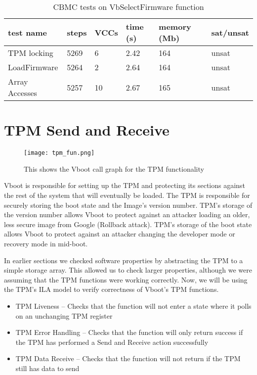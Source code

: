 \begin{table}[!htbp]
    \centering
    \caption{CBMC tests on VbSelectFirmware function}\label{sfw_results}
    \begin{tabular}{llllll}
        \toprule
        test name & steps & VCCs & time (s) & memory (Mb) & sat/unsat  \\ \bottomrule
        TPM locking & 5269 & 6 & 2.42 & 164 & unsat \\
        LoadFirmware & 5264 & 2 & 2.64 & 164 & unsat \\
        Array Accesses & 5257 & 10 & 2.67 & 165 &  unsat \\\bottomrule
    \end{tabular}
\end{table}

\section{TPM Send and Receive}

\begin{figure}[!htbp]
  \centering
  \texttt{[image: tpm\_fun.png]}
  \caption[TPM Call Graph]{This shows the Vboot call graph for the TPM functionality}\label{fig:tpm_call_graph}
\end{figure}

Vboot is responsible for setting up the TPM and protecting its
sections against the rest of the system that will eventually be loaded.
The TPM is responsible for securely storing the boot state and the
Image's version number.
TPM's storage of the version number allows Vboot to protect against 
an attacker loading an older, less secure image from Google (Rollback attack).
TPM's storage of the boot state allows Vboot to protect against an attacker 
changing the developer mode or recovery mode in mid-boot.

In earlier sections we checked software properties by abstracting the TPM to a simple storage array. 
This allowed us to check larger properties, although we were assuming that the TPM functions were working correctly.
Now, we will be using the TPM's ILA model to verify correctness of Vboot's TPM functions.

\begin{itemize}
   \item TPM Liveness -- Checks that the function will not enter a state where it polls on an unchanging TPM register
   \item TPM Error Handling -- Checks that the function will only return success if the TPM has performed a Send and Receive action successfully
   \item TPM Data Receive -- Checks that the function will not return if the TPM still has data to send 
\end{itemize}


